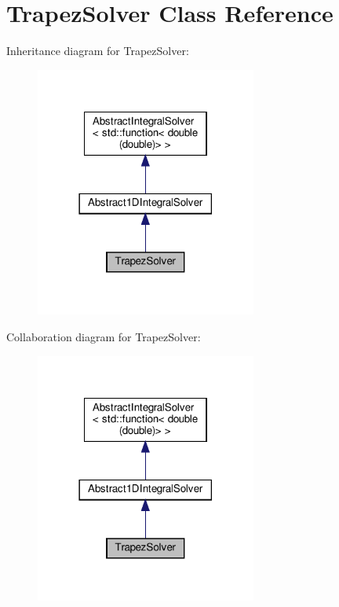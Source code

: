 \hypertarget{class_trapez_solver}{}\section{Trapez\+Solver Class Reference}
\label{class_trapez_solver}


Inheritance diagram for Trapez\+Solver\+:
\nopagebreak
\begin{figure}[H]
\begin{center}
\leavevmode
\includegraphics[width=206pt]{class_trapez_solver__inherit__graph}
\end{center}
\end{figure}


Collaboration diagram for Trapez\+Solver\+:
\nopagebreak
\begin{figure}[H]
\begin{center}
\leavevmode
\includegraphics[width=206pt]{class_trapez_solver__coll__graph}
\end{center}
\end{figure}
